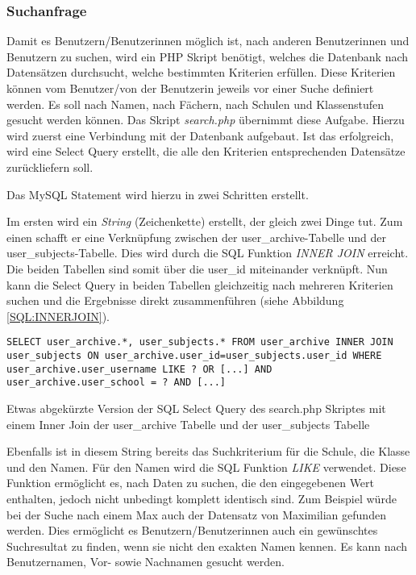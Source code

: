 \documentclass[../main.tex]{subfiles}
\begin{document}
	 \subsubsection{Suchanfrage} \label{PHP:Suchanfrage}
	 Damit es Benutzern/Benutzerinnen möglich ist, nach anderen Benutzerinnen und Benutzern zu suchen, wird ein PHP Skript benötigt, welches die Datenbank nach Datensätzen durchsucht, welche bestimmten Kriterien erfüllen. Diese Kriterien können vom Benutzer/von der Benutzerin jeweils vor einer Suche definiert werden. Es soll nach Namen, nach Fächern, nach Schulen und Klassenstufen gesucht werden können. Das Skript \emph{search.php} übernimmt diese Aufgabe. Hierzu wird zuerst eine Verbindung mit der Datenbank aufgebaut. Ist das erfolgreich, wird eine Select Query erstellt, die alle den Kriterien entsprechenden Datensätze zurückliefern soll. 
	 
	 Das MySQL Statement wird hierzu in zwei Schritten erstellt.
	 
	 Im ersten wird ein \emph{String} (Zeichenkette) erstellt, der gleich zwei Dinge tut. Zum einen schafft er eine Verknüpfung zwischen der user\_archive-Tabelle und der user\_subjects-Tabelle. Dies wird durch die SQL Funktion \emph{INNER JOIN} erreicht. Die beiden Tabellen sind somit über die user\_id miteinander verknüpft. Nun kann die Select Query in beiden Tabellen gleichzeitig nach mehreren Kriterien suchen und die Ergebnisse direkt zusammenführen (siehe Abbildung \ref{SQL:INNERJOIN}).
	 
	 \begin{code}
	 	\begin{center}
	 		\begin{verbatim}
SELECT user_archive.*, user_subjects.* FROM user_archive INNER JOIN user_subjects ON user_archive.user_id=user_subjects.user_id WHERE user_archive.user_username LIKE ? OR [...] AND user_archive.user_school = ? AND [...]
	 		\end{verbatim}
	 		\caption{Etwas abgekürzte Version der SQL Select Query des search.php Skriptes mit einem Inner Join der user\_archive Tabelle und der user\_subjects Tabelle}\label{SQL:INNERJOIN}
		\end{center}
	\end{code}	
	 
	 Ebenfalls ist in diesem String bereits das  Suchkriterium für die Schule, die Klasse und den Namen. Für den Namen wird die SQL Funktion \emph{LIKE} verwendet. Diese Funktion ermöglicht es, nach Daten zu suchen, die den eingegebenen Wert enthalten, jedoch nicht unbedingt komplett identisch sind. Zum Beispiel würde bei der Suche nach einem \glqq Max\grqq{} auch der Datensatz von \glqq Maximilian\grqq{} gefunden werden. Dies ermöglicht es Benutzern/Benutzerinnen auch ein gewünschtes Suchresultat zu finden, wenn sie nicht den exakten Namen kennen. Es kann nach Benutzernamen, Vor- sowie Nachnamen gesucht werden.
	 
\end{document}

